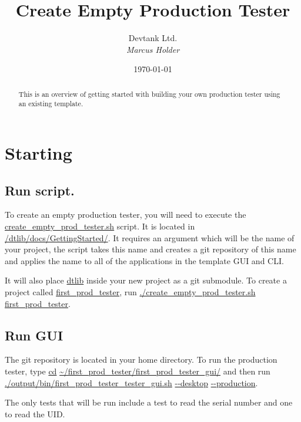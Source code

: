 \documentclass[a4paper,12pt, notitlepage]{article}
\begin{document}
\title{\textbf{\large{Create Empty Production Tester}}}

\author{\normalsize{Devtank Ltd.} \\
        \small\textit{
        Marcus Holder}}
\date{\today}

\maketitle 
\thispagestyle{fancy}


\begin{abstract} 
\noindent
This is an overview of getting started with building your own production tester using an existing template.
\end{abstract}
\vspace{11mm}

\newpage
\tableofcontents
\newpage


\section{Starting}
\label{sec: start}

\subsection{Run script.}
\label{renameStart}

To create an empty production tester, you will need to execute the \url{create_empty_prod_tester.sh} script. It is located in \url{/dtlib/docs/GettingStarted/}. It requires an argument which will be the name of your project, the script takes this name and creates a git repository of this name and applies the name to all of the applications in the template GUI and CLI.

It will also place \url{dtlib} inside your new project as a git submodule. To create a project called \url{first_prod_tester}, run \url{./create_empty_prod_tester.sh} \url{first_prod_tester}.

\subsection{Run GUI}

The git repository is located in your home directory. To run the production tester, type \url{cd} \url{~/first_prod_tester/first_prod_tester_gui/} and then run \url{./output/bin/first_prod_tester_tester_gui.sh} \url{--desktop} \url{--production}.

The only tests that will be run include a test to read the serial number and one to read the UID.
\end{document}
